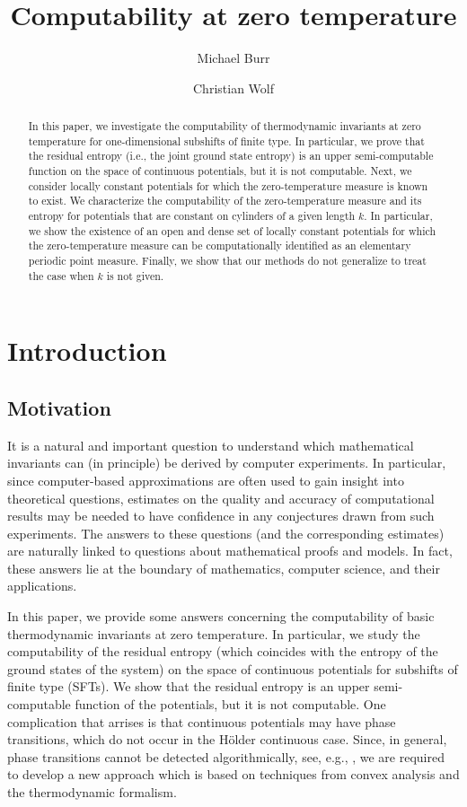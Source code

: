 \documentclass[11pt, reqno]{amsart}
\title{Computability at zero temperature}
\author{Michael Burr}
\author{Christian Wolf}\address{Department of Mathematics, The City College of New York, New York, NY, 10031, USA}\email{cwolf@ccny.cuny.edu}
\begin{document}
\begin{abstract}
In this paper, we investigate  the computability of thermodynamic invariants at zero temperature for one-dimensional subshifts of finite type. In particular, we prove that the residual entropy (i.e., the joint ground state entropy) is an upper semi-computable  function on the space of continuous potentials, but it is not computable.  Next, we consider locally constant potentials for which the zero-temperature measure is known to exist. We  characterize the computability of the zero-temperature measure and its entropy for potentials that are constant on cylinders of a given  length $k$.  In particular, we show the  existence of an open and dense set of locally constant potentials for which the zero-temperature measure can be computationally identified as an elementary periodic point measure. Finally, we show that our methods do not generalize to treat the case when $k$ is not given. 
\end{abstract}
\maketitle

\section{Introduction}

\subsection{Motivation}
It is a natural and important question to understand which mathematical invariants can (in principle) be derived by computer experiments.  In particular, since computer-based approximations are often used to gain insight into theoretical questions, estimates on the quality and accuracy of computational results may be needed to have confidence in any conjectures drawn from such experiments.  The answers to these questions (and the corresponding estimates) are naturally linked to questions about mathematical proofs and models.  In fact, these answers lie at the boundary of mathematics, computer science, and their applications.

In this paper, we provide some answers concerning the computability of basic thermodynamic invariants at zero temperature. 
In particular, we study the computability of the residual entropy (which coincides with the entropy of the ground states of the system) on the space of continuous potentials for subshifts of finite type (SFTs). We show that the residual entropy is an upper semi-computable function of the potentials, but it is not computable.  One complication that arrises is that continuous potentials may have phase transitions, which do not occur in the  H\"older continuous case. Since, in general, phase transitions cannot be detected algorithmically, see, e.g., \cite{Sp,Yap:Zero}, we are required to develop a new approach which is based on techniques from convex analysis and the thermodynamic formalism.
\end{document}
